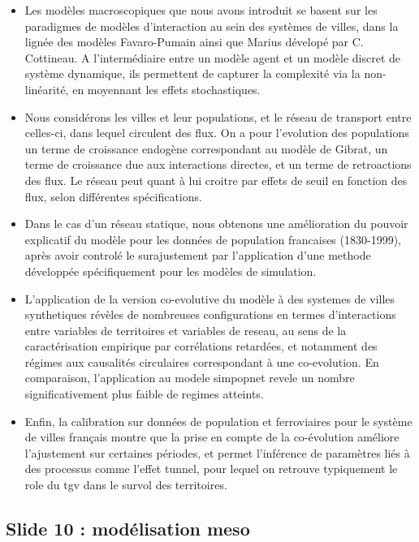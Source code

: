 \documentclass[11pt]{article}
\begin{document}
\begin{itemize}
	\item Les modèles macroscopiques que nous avons introduit se basent sur les paradigmes de modèles d'interaction au sein des systèmes de villes, dans la lignée des modèles Favaro-Pumain ainsi que Marius dévelopé par C. Cottineau. A l'intermédiaire entre un modèle agent et un modèle discret de système dynamique, ils permettent de capturer la complexité via la non-linéarité, en moyennant les effets stochastiques.
	\item Nous considérons les villes et leur populations, et le réseau de transport entre celles-ci, dans lequel circulent des flux. On a pour l'evolution des populations un terme de croissance endogène correspondant au modèle de Gibrat, un terme de croissance due aux interactions directes, et un terme de retroactions des flux. Le réseau peut quant à lui croitre par effets de seuil en fonction des flux, selon différentes spécifications.
	\item Dans le cas d'un réseau statique, nous obtenons une amélioration du pouvoir explicatif du modèle pour les données de population francaises (1830-1999), après avoir controlé le surajustement par l'application d'une methode développée spécifiquement pour les modèles de simulation.
	\item L'application de la version co-evolutive du modèle à des systemes de villes synthetiques révèles de nombreuses configurations en termes d'interactions entre variables de territoires et variables de reseau, au sens de la caractérisation empirique par corrélations retardées, et notamment des régimes aux causalités circulaires correspondant à une co-evolution. En comparaison, l'application au modele simpopnet revele un nombre significativement plus faible de regimes atteints.
	\item Enfin, la calibration sur données de population et ferroviaires pour le système de villes français montre que la prise en compte de la co-évolution améliore l'ajustement sur certaines périodes, et permet l'inférence de paramètres liés à des processus comme l'effet tunnel, pour lequel on retrouve typiquement le role du tgv dans le survol des territoires.
\end{itemize}





\subsection*{Slide 10 : modélisation meso}
\end{document}
